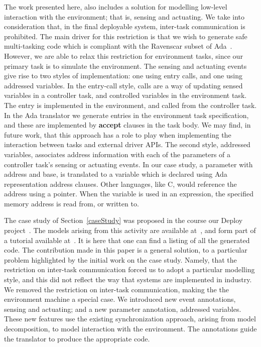 The work presented here, also includes a solution for modelling low-level interaction with the environment; that is, sensing and actuating. We take into consideration that, in the final deployable system, inter-task communication is prohibited. The main driver for this restriction is that we wish to generate safe multi-tasking code which is compliant with the Ravenscar subset of Ada~\cite{ravenspark}. However, we are able to relax this restriction for environment tasks, since our primary task is to simulate the environment. The sensing and actuating events give rise to two styles of implementation: one using entry calls, and one using addressed variables. In the entry-call style, calls are a way of updating sensed variables in a controller task, and controlled variables in the environment task. The entry is implemented in the environment, and called from the controller task. In the Ada translator we generate entries in the environment task specification, and these are implemented by \textbf{accept} clauses in the task body. We may find, in future work, that this approach has a role to play when implementing the interaction between tasks and external driver APIs. The second style, addressed variables, associates address information with each of the parameters of a controller task's sensing or actuating events.  In our case study, a parameter with address and base, is translated to a variable which is declared using Ada representation address clauses. Other languages, like C, would reference the address using a pointer. When the variable is used in an expression, the specified memory address is read from, or written to.

The case study of Section~\ref{caseStudy} was proposed in the course our Deploy project~\cite{DEPLOY}. The models arising from this activity are available at~\cite{aeHeatingControllerArch}, and form part of a tutorial available at~\cite{CGTutorial}. It is here that one can find a listing of all the generated code. The contribution made in this paper is a general solution, to a particular problem highlighted by the initial work on the case study. Namely, that the restriction on inter-task communication forced us to adopt a particular modelling style, and this did not reflect the way that systems are implemented in industry. We removed the restriction on inter-task communication, making the the environment machine a special case. We introduced new event annotations, sensing and actuating; and a new parameter annotation, addressed variables. These new features use the existing synchronization approach, arising from model decomposition, to model interaction with the environment. The annotations guide the translator to produce the appropriate code.


